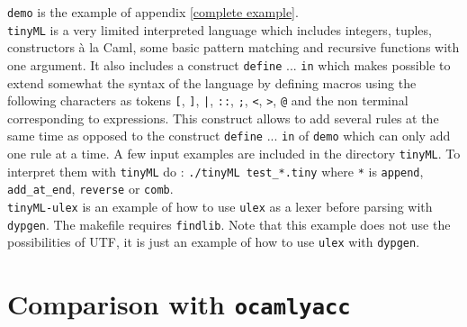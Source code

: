 \documentclass[12pt]{article}
\begin{document}
{\texttt{demo} is the example of appendix \ref{complete example}.\\

\texttt{tinyML} is a very limited interpreted language which includes integers, tuples, constructors \`a la Caml, some basic pattern matching and recursive functions with one argument. It also includes a construct \texttt{define} ... \texttt{in} which makes possible to extend somewhat the syntax of the language by defining macros using the following characters as tokens \texttt{[}, \texttt{]}, \texttt{|}, \texttt{::}, \texttt{;}, \texttt{<}, \texttt{>}, \texttt{@} and the non terminal corresponding to expressions. This construct allows to add several rules at the same time as opposed to the construct \texttt{define} ... \texttt{in} of \texttt{demo} which can only add one rule at a time. A few input examples are included in the directory \texttt{tinyML}. To interpret them with \texttt{tinyML} do : \texttt{./tinyML test\_*.tiny} where \texttt{*} is \texttt{append}, \texttt{add\_at\_end}, \texttt{reverse} or \texttt{comb}.\\

\texttt{tinyML-ulex} is an example of how to use \texttt{ulex} as a lexer before parsing with \texttt{dypgen}. The makefile requires \texttt{findlib}. Note that this example does not use the possibilities of UTF, it is just an example of how to use \texttt{ulex} with \texttt{dypgen}.

\appendix
\section{Comparison with \texttt{ocamlyacc}}


}
\end{document}
